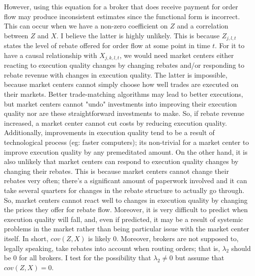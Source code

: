 \documentclass[12pt,a4paper]{article}
\begin{document}
		However, using this equation for a broker that does receive payment for order flow may produce inconsistent estimates since the functional form is incorrect. This can occur when we have a non-zero coefficient on $Z$ and a correlation between $Z$ and $X$. I believe the latter is highly unlikely. This is because $Z_{j, l, t}$ states the level of rebate offered for order flow at some point in time $t$. For it to have a causal relationship with $X_{j, k, l, t}$, we would need market centers either reacting to execution quality changes by changing rebates and/or responding to rebate revenue with changes in execution quality. The latter is impossible, because market centers cannot simply choose how well trades are executed on their markets. Better trade-matching algorithms may lead to better executions, but market centers cannot "undo" investments into improving their execution quality nor are these straightforward investments to make. So, if rebate revenue increased, a market center cannot cut costs by reducing execution quality. Additionally, improvements in execution quality tend to be a result of technological process (eg: faster computers); its non-trivial for a market center to improve execution quality by any premeditated amount. On the other hand, it is also unlikely that market centers can respond to execution quality changes by changing their rebates. This is because market centers cannot change their rebates very often; there's a significant amount of paperwork involved and it can take several quarters for changes in the rebate structure to actually go through. So, market centers cannot react well to changes in execution quality by changing the prices they offer for rebate flow. Moreover, it is very difficult to predict when execution quality will fall, and, even if predicted, it may be a result of systemic problems in the market rather than being particular issue with the market center itself. In short, $cov(Z, X)$ is likely $0$. Moreover, brokers are not supposed to, legally speaking, take rebates into account when routing orders; that is, $\lambda_2$ should be $0$ for all brokers. I test for the possibility that $\lambda_2 \neq 0$ but assume that $cov(Z, X) = 0$. 
		
\end{document}

